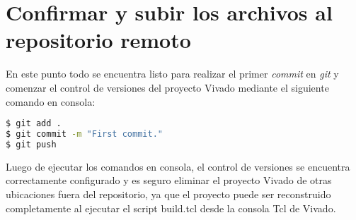 \section{Confirmar y subir los archivos al repositorio remoto}

	En este punto todo se encuentra listo para realizar el primer \textit{commit} en \textit{git} y comenzar el control de versiones del proyecto Vivado mediante el siguiente comando en consola:
	
\begin{lstlisting}[language=bash, frame=single]
$ git add .
$ git commit -m "First commit."
$ git push

\end{lstlisting}

	Luego de ejecutar los comandos en consola, el control de versiones se encuentra correctamente configurado y es seguro eliminar el proyecto Vivado de otras ubicaciones fuera del repositorio, ya que el proyecto puede ser reconstruido completamente al ejecutar el script build.tcl desde la consola Tcl de Vivado.